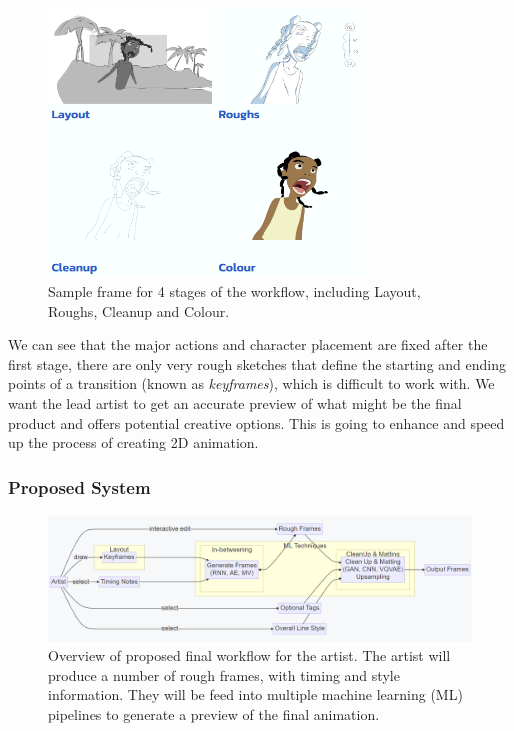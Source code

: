 \begin{figure}
    \centering
    \includegraphics[width=0.75\textwidth]{images/introduction/stages.png}
    \caption{Sample frame for 4 stages of the workflow, including Layout, Roughs, Cleanup and Colour.} 
    \label{fig:stages}
\end{figure}

We can see that the major actions and character placement are fixed after the first stage, there are only very rough sketches that define the starting and ending points of a transition (known as \textit{keyframes}), which is difficult to work with.  We want the lead artist to get an accurate preview of what might be the final product and offers potential creative options. This is going to enhance and speed up the process of creating 2D animation.

\subsubsection{Proposed System}

\begin{figure}
    \centering
    \includegraphics[width=1\textwidth]{images/introduction/proposed_workflow.png}
    \caption{Overview of proposed final workflow for the artist. The artist will produce a number of rough frames, with timing and style information. They will be feed into multiple machine learning (ML) pipelines to generate a preview of the final animation.} 
    \label{fig:proposed_worflow}
\end{figure}

